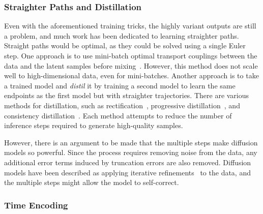 \subsubsection{Straighter Paths and Distillation}

Even with the aforementioned training tricks, the highly variant outputs are still a problem, and much work has been dedicated to learning straighter paths.
Straight paths would be optimal, as they could be solved using a single Euler step.
One approach is to use mini-batch optimal transport couplings between the data and the latent samples before mixing~\cite{ImprovingGeneralizingFlowbased}.
However, this method does not scale well to high-dimensional data, even for mini-batches.
Another approach is to take a trained model and \textit{distil} it by training a second model to learn the same endpoints as the first model but with straighter trajectories.
There are various methods for distillation, such as rectification~\cite{FlowStraightFast}, progressive distillation~\cite{ProgressiveDistillationFast}, and consistency distillation~\cite{ConsistencyModels}.
Each method attempts to reduce the number of inference steps required to generate high-quality samples.

However, there is an argument to be made that the multiple steps make diffusion models so powerful.
Since the process requires removing noise from the data, any additional error terms induced by truncation errors are also removed.
Diffusion models have been described as applying iterative refinements~\cite{ImageSuperResolutionIterative} to the data, and the multiple steps might allow the model to self-correct.

\subsubsection{Time Encoding}
\label{sec:time_encoding}

